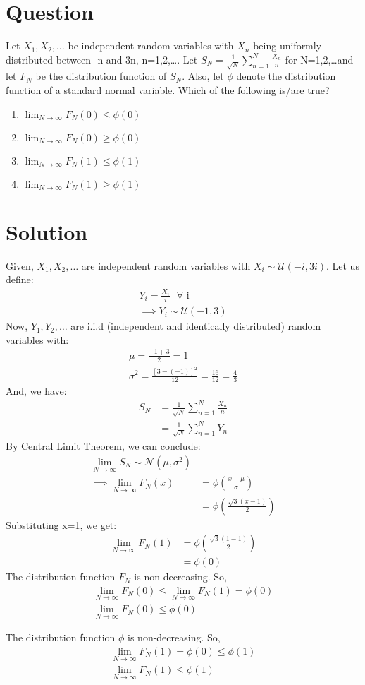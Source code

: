 \documentclass[journal,12pt,twocolumn]{IEEEtran}
\begin{document}
\section*{Question}
Let $X_1,X_2,\dots$ be independent random variables with $X_n$ being uniformly distributed between -n and 3n, n=1,2,\dots. 
Let $S_N = \frac{1}{\sqrt{N}} \sum_{n=1}^N \frac{X_n}{n}$ for N=1,2,\dots and let $F_N$ be the distribution function of $S_N$. Also, let $\phi$ denote the distribution function of a standard normal variable. Which of the following is/are true? 
\begin{enumerate}[label=\Alph*)]
    \item $\lim_{N\to\infty} F_N(0)\leq \phi(0)$
    \item $\lim_{N\to\infty} F_N(0)\geq \phi(0)$
    \item $\lim_{N\to\infty} F_N(1)\leq \phi(1)$
    \item $\lim_{N\to\infty} F_N(1)\geq \phi(1)$
\end{enumerate}

\section*{Solution}
Given, $X_1,X_2,\dots$ are independent random variables with $X_i\sim \mathcal U(-i,3i)$. Let us define:
\begin{align}
    Y_i = \frac{X_i}{i}\text{ }\forall\text{ i} \\
    \implies Y_i \sim \mathcal U(-1,3)
\end{align}
Now, $Y_1,Y_2,\dots$ are i.i.d (independent and identically distributed) random variables with:
\begin{align}
    \mu = \frac{-1 + 3}{2} = 1\\
    \sigma^2 = \frac{[3 - (-1)]^2}{12} = \frac{16}{12} = \frac{4}{3}
\end{align}
And, we have:
\begin{align}
  S_N &= \frac{1}{\sqrt{N}} \sum_{n=1}^N \frac{X_n}{n} \\
      &= \frac{1}{\sqrt{N}} \sum_{n=1}^N Y_n
\end{align}
By Central Limit Theorem, we can conclude:
\begin{align}
\lim_{N\to\infty} S_N \sim \mathcal N(\mu,\sigma^2)\\
\implies \lim_{N\to\infty} F_N(x) &= \phi\left(\frac{x-\mu}{\sigma}\right)\\
&= \phi\left(\frac{\sqrt{3}(x-1)}{2}\right)
\end{align}
Substituting x=1, we get:
\begin{align}
    \lim_{N\to\infty} F_N(1) &=  \phi\left(\frac{\sqrt{3}(1-1)}{2}\right)\\
    &= \phi(0)
\end{align}
The distribution function $F_N$ is non-decreasing. So,
\begin{align}
    \lim_{N\to\infty} F_N(0) \leq \lim_{N\to\infty} F_N(1) = \phi(0)\\
    \lim_{N\to\infty} F_N(0) \leq \phi(0)
\end{align}

The distribution function $\phi$ is non-decreasing. So,
\begin{align}
    \lim_{N\to\infty} F_N(1) = \phi(0) \leq \phi(1)\\
    \lim_{N\to\infty} F_N(1) \leq \phi(1)
\end{align}
\bigskip
{}
\end{document}
